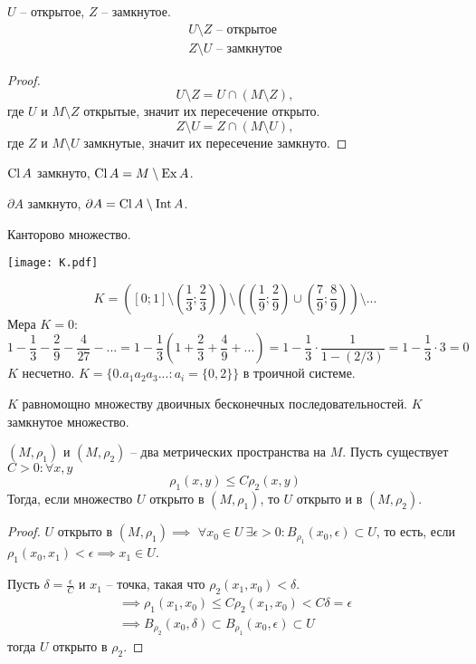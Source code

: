 \documentclass[main]{subfiles}
\begin{document}
\begin{proposition}
    $U$ -- открытое, $Z$ -- замкнутое.
    \begin{gather*}
        U \setminus Z \text{ -- открытое}\\
        Z \setminus U \text{ -- замкнутое}
    \end{gather*}
\end{proposition}
\begin{proof}
    \[U \setminus Z = U \cap (M \setminus Z),\]
    где $U$ и $M \setminus Z$ открытые, значит их пересечение открыто.
    \[Z \setminus U = Z \cap (M \setminus U),\]
    где $Z$ и $M \setminus U$ замкнутые, значит их пересечение замкнуто.
\end{proof}
\begin{corollary}
    $\operatorname{Cl} A$ замкнуто, $\operatorname{Cl} A = M \setminus \operatorname{Ex} A$.

    $\partial A$ замкнуто, $\partial A = \operatorname{Cl} A \setminus \operatorname{Int} A$.
\end{corollary}

\begin{example}
    Канторово множество.

    \begin{center}
        \texttt{[image: K.pdf]}
    \end{center}

    \[K = \left( \left[0;1\right]
        \setminus \left(\frac{1}{3}; \frac{2}{3}\right) \right)
        \setminus \left( \left(\frac{1}{9}; \frac{2}{9}\right)
        \cup \left(\frac{7}{9}; \frac{8}{9}\right) \right)
        \setminus ...\]
    Мера $K = 0$:
    \[1 - \frac{1}{3} - \frac{2}{9} - \frac{4}{27} - ... =
        1 - \frac{1}{3} \left(1 + \frac{2}{3} + \frac{4}{9} + ...\right) =
        1 - \frac{1}{3} \cdot \frac{1}{1- (2/3)} =
        1 - \frac{1}{3} \cdot 3 = 0\]
    $K$ несчетно. $K = \{0.a_1 a_2 a_3 ...: a_i = \{0, 2\}\}$ в троичной системе.

    $K$ равномощно множеству двоичных бесконечных последовательностей.
    $K$ замкнутое множество.
\end{example}

\begin{theorem}
    $(M, \rho_1)$ и $(M, \rho_2)$ -- два метрических пространства на $M$.
    Пусть существует $C > 0: \forall x,y$
    \[\rho_1 (x,y) \le C \rho_2(x,y)\]
    Тогда, если множество $U$ открыто в $(M, \rho_1)$,
    то $U$ открыто и в $(M, \rho_2)$.
\end{theorem}
\begin{proof}
    $U$ открыто в $(M, \rho_1) \implies$
    $\forall x_0 \in U \ \exists \epsilon > 0: B_{\rho_1} (x_0, \epsilon) \subset U$,
    то есть, если $\rho_1 (x_0, x_1) < \epsilon \implies x_1 \in U$.

    Пусть $\delta = \frac{\epsilon}{C}$ и $x_1$ -- точка, такая что $\rho_2 (x_1, x_0) < \delta$.
    \begin{gather*}
        \implies \rho_1 (x_1, x_0) \le C \rho_2 (x_1, x_0) < C\delta = \epsilon\\
        \implies B_{\rho_2}(x_0, \delta) \subset B_{\rho_1}(x_0, \epsilon) \subset U
    \end{gather*}
    тогда $U$ открыто в $\rho_2$.
\end{proof}
\end{document}
